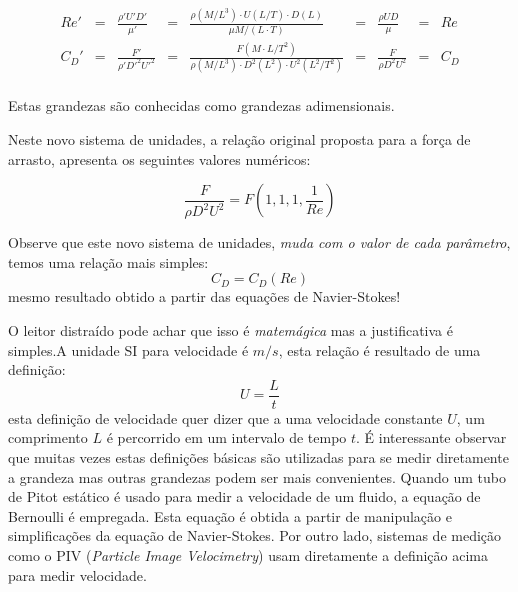 \[
\begin{aligned}
Re' &=& \frac{\rho' U' D'}{\mu'} &=& \frac{\rho (M/L^3) \cdot U (L/T) \cdot D (L) }{\mu M/(L\cdot T)} &=& \frac{\rho U D}{\mu} &=& Re \\
C_D' &=& \frac{F'}{\rho' D'^2 U'^2} &=& \frac{F (M\cdot L/T^2)}{\rho (M/L^3) \cdot D^2 (L^2) \cdot U^2 (L^2/T^2)} &=& \frac{F}{\rho D^2 U^2} &=& C_D  \\
\end{aligned}
\]

Estas grandezas são conhecidas como grandezas adimensionais.

Neste novo sistema de unidades, a relação original proposta para a força de arrasto, apresenta os seguintes valores numéricos:

\[
\frac{F}{\rho D^2 U^2} = F\left(1,1,1, \frac{1}{Re} \right)
\]

Observe que este novo sistema de unidades, \emph{ muda com o valor de cada parâmetro}, temos uma relação mais simples:
\[
C_D = C_D(Re)
\]
mesmo resultado obtido a partir das equações de Navier-Stokes!

O leitor distraído pode achar que isso é \emph{matemágica} mas a justificativa é simples.A unidade SI para velocidade é $m/s$, esta relação é resultado de uma definição:
\[
U = \frac{L}{t}
\]
esta definição de velocidade quer dizer que a uma velocidade constante $U$, um comprimento $L$ é percorrido em um intervalo de tempo $t$. É interessante observar que muitas vezes estas definições básicas são utilizadas para se medir diretamente a grandeza mas outras grandezas podem ser mais convenientes. Quando um tubo de Pitot estático é usado para medir a velocidade de um fluido, a equação de Bernoulli é empregada. Esta equação é obtida a partir de manipulação e simplificações da equação de Navier-Stokes. Por outro lado, sistemas de medição como o PIV (\emph{Particle Image Velocimetry}) usam diretamente a definição acima para medir velocidade.

